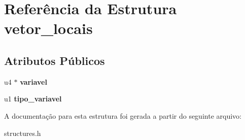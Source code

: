 \hypertarget{structvetor__locais}{}\section{Referência da Estrutura vetor\+\_\+locais}
\label{structvetor__locais}
\subsection*{Atributos Públicos}
\begin{DoxyCompactItemize}
\item 
\mbox{\label{structvetor__locais_a474212032f52e10c83331da9efdbf0e8}} 
u4 $\ast$ {\bfseries variavel}
\item 
\mbox{\label{structvetor__locais_a8f30386b3b7757677d00d6e14e535278}} 
u1 {\bfseries tipo\+\_\+variavel}
\end{DoxyCompactItemize}


A documentação para esta estrutura foi gerada a partir do seguinte arquivo\+:\begin{DoxyCompactItemize}
\item 
structures.\+h\end{DoxyCompactItemize}
